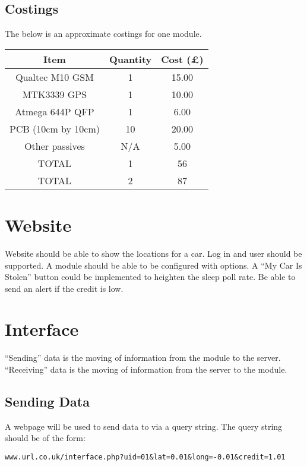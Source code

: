 \documentclass[12pt]{article}
\begin{document}
\subsection{Costings}
The below is an approximate costings for one module. 

\begin{table}[!h]
\begin{tabular}{ccc}
Item		&	Quantity	& 	Cost (\pounds) \\ \hline
Qualtec M10 GSM & 	1		& 	15.00 \\
MTK3339 GPS	&	1		&	10.00 \\
Atmega 644P QFP & 	1		&	6.00  \\
PCB (10cm by 10cm)&	10		&	20.00 \\
Other passives	&	N/A		&	5.00 \\ \hline
TOTAL		&	1		&	56 \\ \hline
TOTAL 		&	2		&	87 \\ \hline
\end{tabular}
\end{table}


\section{Website}

Website should be able to show the locations for a car. 
Log in and user should be supported. 
A module should be able to be configured with options.
A ``My Car Is Stolen'' button could be implemented to heighten the sleep poll rate.
Be able to send an alert if the credit is low. 

\section{Interface}

``Sending'' data is the moving of information from the module to the server.
``Receiving'' data is the moving of information from the server to the module.

\subsection{Sending Data}

A webpage will be used to send data to via a query string. 
The query string should be of the form:

\begin{lstlisting}
www.url.co.uk/interface.php?uid=01&lat=0.01&long=-0.01&credit=1.01
\end{lstlisting}
\end{document}
